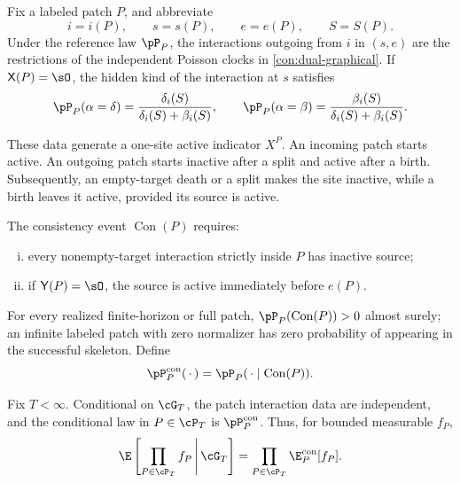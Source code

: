 \begin{definition}
\label{def:consistent-patch-law}
Fix a labeled patch \(P\), and abbreviate
\[
  i=i(P),\qquad s=s(P),\qquad e=e(P),\qquad S=S(P).
\]
Under the reference law \(\pP_P\), the interactions outgoing from \(i\)
in \((s,e)\) are the restrictions of the independent Poisson clocks
in \cref{con:dual-graphical}. If \(\mathsf X(P)=\sO\), the hidden kind
of the interaction at \(s\) satisfies
\begin{equation}
  \pP_P(\alpha=\delta)
  =
  \frac{\delta_i(S)}{\delta_i(S)+\beta_i(S)},
  \qquad
  \pP_P(\alpha=\beta)
  =
  \frac{\beta_i(S)}{\delta_i(S)+\beta_i(S)}.
  \label{eq:boundary-kind-law}
\end{equation}

These data generate a one-site active indicator \(X^P\). An incoming
patch starts active. An outgoing patch starts inactive after a split
and active after a birth. Subsequently, an empty-target death or a
split makes the site inactive, while a birth leaves it active,
provided its source is active.

The consistency event \(\operatorname{Con}(P)\) requires:
\begin{enumerate}[(i)]
  \item every nonempty-target interaction strictly inside \(P\) has
  inactive source;
  \item if \(\mathsf Y(P)=\sO\), the source is active immediately
  before \(e(P)\).
\end{enumerate}
For every realized finite-horizon or full patch,
\(\pP_P(\operatorname{Con}(P))>0\) almost surely; an infinite labeled
patch with zero normalizer has zero probability of appearing in the
successful skeleton. Define
\[
  \pP_P^{\mathrm{con}}(\,\cdot\,)
  =
  \pP_P(\,\cdot\mid\operatorname{Con}(P)).
\]
\end{definition}

\begin{theorem}
\label{thm:patch-factorization}
Fix \(T<\infty\). Conditional on \(\cG_T\), the patch interaction data
are independent, and the conditional law in
\(P\in\cP_T\) is \(\pP_P^{\mathrm{con}}\). Thus, for bounded
measurable \(f_P\),
\begin{equation}
  \E\left[
    \prod_{P\in\cP_T}f_P
    \,\middle|\,\cG_T
  \right]
  =
  \prod_{P\in\cP_T}
  \E_P^{\mathrm{con}}[f_P].
  \label{eq:patch-factorization}
\end{equation}
\end{theorem}

